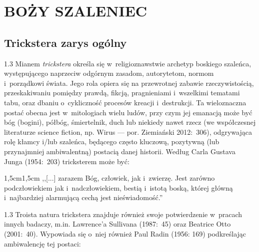 \documentclass[11pt,a4paper,twoside]{report}
\begin{document}
\part{BOŻY SZALENIEC}
\clearpage{\pagestyle{empty}\cleardoublepage}
\chapter{Trickstera zarys ogólny}

\begin{spacing}{1.3}
Mianem \emph{trickstera} określa się w~religioznawstwie archetyp boskiego szaleńca, występującego naprzeciw odgórnym zasadom, autorytetom, normom i~porządkowi świata. Jego rola opiera się na przewrotnej zabawie rzeczywistością, przeskakiwaniu pomiędzy prawdą, fikcją, pragnieniami i~wszelkimi tematami tabu, oraz dbaniu o~cykliczność procesów kreacji i~destrukcji. Ta wieloznaczna postać obecna jest w~mitologiach wielu ludów, przy czym jej emanacją może być bóg (bogini), półbóg, śmiertelnik, duch lub niekiedy nawet rzecz (we współczesnej literaturze science fiction, np. Wirus --- por. Ziemiański 2012:~306), odgrywająca rolę kłamcy i/lub szaleńca, będącego często kluczową, pozytywną (lub przynajmniej ambiwalentną) postacią danej historii. Według Carla Gustava Junga (1954:~203) tricksterem może być:
\end{spacing}

\begin{adjustwidth}{1,5cm}{1,5cm}
\small{
,,[...] zarazem Bóg, człowiek, jak i~zwierzę. Jest zarówno podczłowiekiem jak i~nadczłowiekiem, bestią i~istotą boską, której główną i~najbardziej alarmującą cechą jest nieświadomość.''\\
}
\end{adjustwidth}

\begin{spacing}{1.3}
Troista natura trickstera znajduje również swoje potwierdzenie w~pracach innych badaczy, m.in. Lawrence'a Sullivana (1987:~45) oraz Beatrice Otto (2001:~40). Wypowiada się o~niej również Paul Radin (1956: 169) podkreślając ambiwalencję tej postaci:
\end{spacing}
\end{document}
